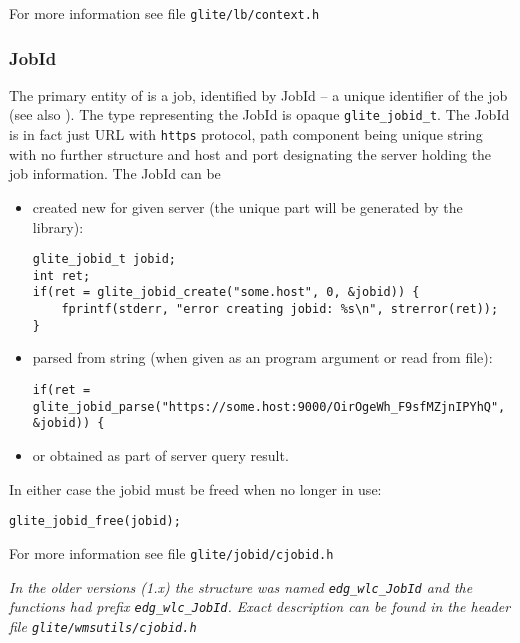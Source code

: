 For more information see file \verb'glite/lb/context.h'

\subsubsection{JobId} 
The primary entity of \LB is a job, identified by JobId -- a unique
identifier of the job (see also \cite{LBUG}). The type representing
the JobId is opaque \verb'glite_jobid_t'. The JobId is in fact
just URL with \verb'https' protocol, path component being unique string
with no further structure and host and port designating the \LB server
holding the job information. The JobId can be
\begin{itemize}
\item created new for given \LB server (the unique part will be
generated by the \LB library):
\begin{lstlisting}
glite_jobid_t jobid;
int ret; 
if(ret = glite_jobid_create("some.host", 0, &jobid)) {
	fprintf(stderr, "error creating jobid: %s\n", strerror(ret));
}
\end{lstlisting}
\item parsed from string (\eg when given as an program argument or
read from file):
\begin{lstlisting}[firstnumber=3]
if(ret = glite_jobid_parse("https://some.host:9000/OirOgeWh_F9sfMZjnIPYhQ", &jobid)) {
\end{lstlisting}
\item or obtained as part of \LB server query result.
\end{itemize}
In either case the jobid must be freed when no longer in use:
\begin{lstlisting}
glite_jobid_free(jobid);
\end{lstlisting}

For more information see file \verb'glite/jobid/cjobid.h'

%
{\it In the older \LB versions (1.x) the
structure was named \verb'edg_wlc_JobId' and the functions had prefix
\verb'edg_wlc_JobId'. Exact description can be found in the
header file \verb'glite/wmsutils/cjobid.h'}


